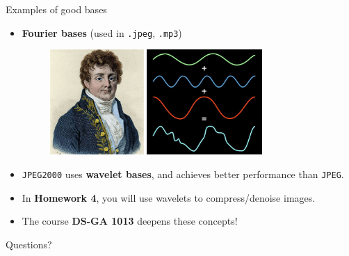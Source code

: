 \documentclass{beamer}
\begin{document}
\begin{frame}[t]{Examples of good bases}
	\begin{itemize}
		\item \textbf{Fourier bases} (used in \texttt{.jpeg}, \texttt{.mp3})
			\begin{figure}
				\includegraphics[height=4cm]{./fourier.jpeg}
				\hspace{1cm}
				\includegraphics[height=4cm]{./fourier_dec.jpg}
			\end{figure}

		\item \texttt{JPEG2000} uses \textbf{wavelet bases}, and achieves better performance than \texttt{JPEG}.
		\item In \textbf{Homework 4}, you will use wavelets to compress/denoise images.
		\item The course \textbf{DS-GA 1013} deepens these concepts!
	\end{itemize}
\end{frame}
\appendix
\backupbegin
\begin{frame}[t]{Questions?}
	\grid
\end{frame}
\backupend
\end{document}
